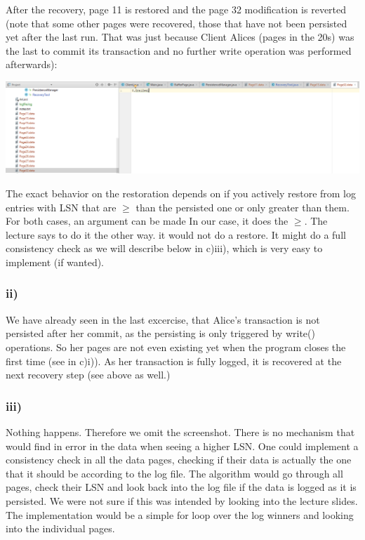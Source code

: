 \documentclass[ngerman]{dis-template-add}
\begin{document}
After the recovery, page 11 is restored and the page 32 modification is reverted (note that some other pages were recovered, those that have not been persisted yet after the last run. That was just because Client Alices (pages in the 20s) was the last to commit its transaction and no further write operation was performed afterwards):

\includegraphics[scale=0.5]{excrecovered.png}

The exact behavior on the restoration depends on if you actively restore from log entries with LSN that are $\geq$ than the persisted one or only greater than them.
For both cases, an argument can be made
In our case, it does the $\geq$.
The lecture says to do it the other way. it would not do a restore.
It might do a full consistency check as we will describe below in c)iii), which is very easy to implement (if wanted).

\subsubsection*{ii)}
We have already seen in the last excercise, that Alice's transaction is not persisted after her commit, as the persisting is only triggered by write() operations.
So her pages are not even existing yet when the program closes the first time (see in c)i)).
As her transaction is fully logged, it is recovered at the next recovery step (see above as well.)

\subsubsection*{iii)}
Nothing happens. Therefore we omit the screenshot.
There is no mechanism that would find in error in the data when seeing a higher LSN.
One could implement a consistency check in all the data pages, checking if their data is actually the one that it should be according to the log file.
The algorithm would go through all pages, check their LSN and look back into the log file if the data is logged as it is persisted.
We were not sure if this was intended by looking into the lecture slides.
The implementation would be a simple for loop over the log winners and looking into the individual pages.
\end{document}
